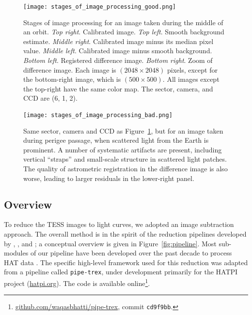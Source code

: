 \documentclass[12pt,twocolumn,tighten]{aastex62}
\begin{document}
\begin{figure}[!t]
    \begin{center}
        \leavevmode
        \texttt{[image: stages\_of\_image\_processing\_good.png]}
    \end{center}
    \vspace{-0.6cm}
    \caption{
        Stages of image processing for an image taken during the middle
        of an orbit.
        {\it Top right}. Calibrated image.
        {\it Top left}. Smooth background estimate.
        {\it Middle right}. Calibrated image minus its median pixel value.
        {\it Middle left}. Calibrated image minus smooth background.
        {\it Bottom left}. Registered difference image.
        {\it Bottom right}. Zoom of difference image.
        Each image is $(2048\times2048)$ pixels, except for the bottom-right 
        image, which is $(500\times500)$.
        All images except the top-right have the same color map.
        The sector, camera, and CCD are (6, 1, 2).
        \label{fig:stages_good}
    }
\end{figure}

\begin{figure}[!t]
    \begin{center}
        \leavevmode
        \texttt{[image: stages\_of\_image\_processing\_bad.png]}
    \end{center}
    \vspace{-0.6cm}
    \caption{
        Same sector, camera and CCD as Figure~\ref{fig:stages_good}, but for an image taken during
        perigee passage, when scattered light from the Earth is
        prominent.
        A number of systematic artifacts are present,
        including vertical ``straps'' and small-scale structure in scattered light
        patches.
        The quality of astrometric registration in the difference image is also
        worse, leading to larger residuals in the lower-right panel.
        \label{fig:stages_bad}
    }
\end{figure}

\subsection{Overview}

To reduce the TESS images to light curves, we adopted an image
subtraction approach.  The overall method is in the spirit of the
reduction pipelines developed by \citet{Pal_2009},
\citet{huang_high-precision_2015}, \citet{soares-furtado_image_2017}
and \citet{oelkers_precision_2018}; a conceptual overview is given in
Figure~\ref{fig:pipeline}.  Most sub-modules of our pipeline have been
developed over the past decade to process HAT data \citep[{\it
e.g.},][]{bakos_hat_review_2018}.  The specific high-level framework
used for this reduction was adapted from a pipeline called
\texttt{pipe-trex}, under development primarily for the HATPI project
(\url{hatpi.org}).  The code is available
online\footnote{\url{github.com/waqasbhatti/pipe-trex}, commit
\texttt{cd9f9bb}.}.
\end{document}
